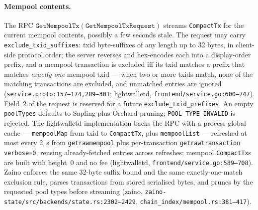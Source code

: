 \documentclass[11pt,a4paper]{article}
\theoremstyle{definition}
\begin{document}
\paragraph{Mempool contents.} The RPC
$\mathtt{GetMempoolTx}(\mathtt{GetMempoolTxRequest})$ streams
\texttt{CompactTx} for the current mempool contents, possibly a few
seconds stale. The request may carry \texttt{exclude\_txid\_suffixes}:
txid byte-suffixes of any length up to 32 bytes, in client-side protocol
order; the server reverses and hex-encodes each into a display-order
prefix, and a mempool transaction is excluded iff its txid matches a
prefix that matches \emph{exactly one} mempool txid --- when two or more
txids match, none of the matching transactions are excluded, and
unmatched entries are ignored (\texttt{service.proto:157--174,289--301};
\textsf{lightwalletd}, \texttt{frontend/service.go:600--747}). Field~2 of
the request is reserved for a future \texttt{exclude\_txid\_prefixes}.
An empty \texttt{poolTypes} defaults to Sapling-plus-Orchard pruning;
\texttt{POOL\_TYPE\_INVALID} is rejected. The lightwalletd
implementation backs the RPC with
a process-global cache --- \texttt{mempoolMap} from txid to
\texttt{CompactTx}, plus \texttt{mempoolList} --- refreshed at most every
2~s from \texttt{getrawmempool} plus per-transaction
\texttt{getrawtransaction} \texttt{verbose=0}, reusing already-fetched
entries across refreshes; mempool \texttt{CompactTx}s are built with
height~0 and no fee (\textsf{lightwalletd},
\texttt{frontend/service.go:589--708}). Zaino enforces the same 32-byte
suffix bound and the same exactly-one-match exclusion rule, parses
transactions from stored serialised bytes, and prunes by the requested
pool types before streaming (\textsf{zaino},
\texttt{zaino-state/src/backends/state.rs:2302--2429},
\texttt{chain\_index/mempool.rs:381--417}).
\end{document}
